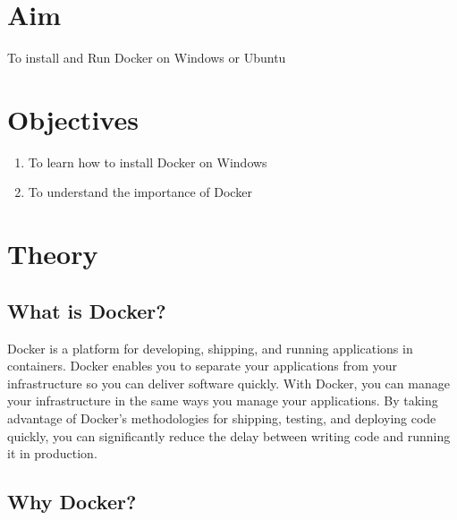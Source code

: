 \documentclass[11pt]{article}
\begin{document}
\tableofcontents
\thispagestyle{empty}
\clearpage

\setcounter{page}{1}

\section{Aim}
To install and Run Docker on Windows or Ubuntu

\section{Objectives}
\begin{enumerate}
    \item To learn how to install Docker on Windows
    \item To understand the importance of Docker
\end{enumerate}

\section{Theory}

\subsection{What is Docker?}

Docker is a platform for developing, shipping, and running applications in containers. Docker enables you to separate your applications from your infrastructure so you can deliver software quickly. With Docker, you can manage your infrastructure in the same ways you manage your applications. By taking advantage of Docker’s methodologies for shipping, testing, and deploying code quickly, you can significantly reduce the delay between writing code and running it in production.

\subsection{Why Docker?}
\end{document}
